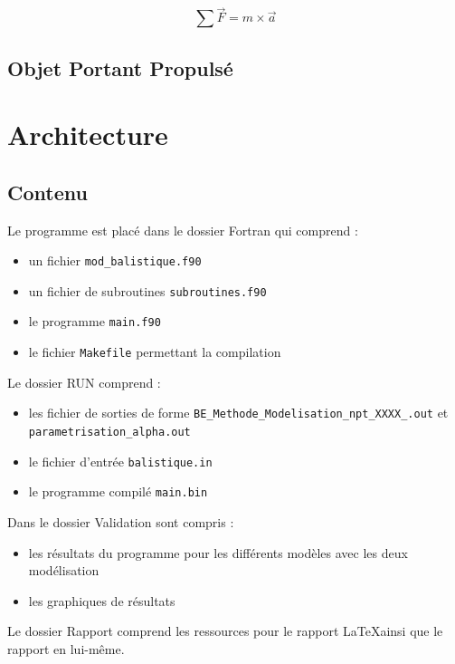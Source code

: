 \documentclass[a4paper,oneside]{article}
\begin{document}
\[
\sum \overrightarrow{F} = m \times \overrightarrow{a}
\]

\subsection{Objet Portant Propulsé}




\section{Architecture}

\subsection{Contenu}

Le programme est placé dans le dossier Fortran qui comprend :

\begin{itemize}
	\item un fichier \verb?mod_balistique.f90? %
	\item un fichier de subroutines \verb?subroutines.f90?
	\item le programme \verb?main.f90?
	\item le fichier \verb?Makefile? permettant la compilation\\
	\end{itemize}

Le dossier RUN comprend :
\begin{itemize}
	\item les fichier de sorties de forme \verb?BE_Methode_Modelisation_npt_XXXX_.out? et \verb? parametrisation_alpha.out?
	\item le fichier d'entrée \verb?balistique.in?
	\item le programme compilé \verb?main.bin?\\
\end{itemize}

Dans le dossier Validation sont compris :
\begin{itemize}
	\item les résultats du programme pour les différents modèles avec les deux modélisation
	\item les graphiques de résultats\\
\end{itemize}

Le dossier Rapport comprend les ressources pour le rapport \LaTeX  ainsi que le rapport en lui-même.
\end{document}
